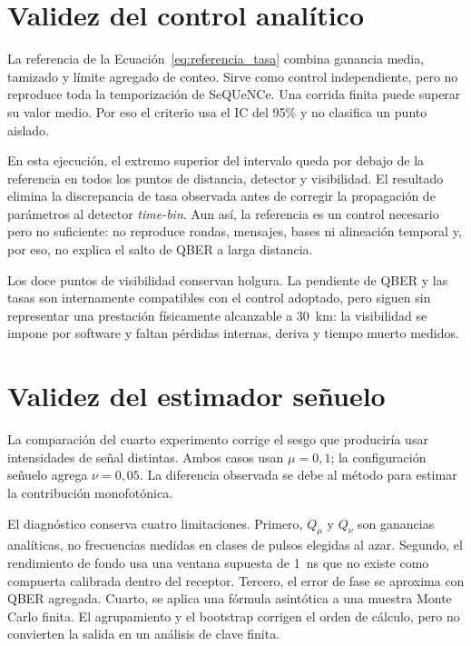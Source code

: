 \section{Validez del control analítico}

La referencia de la Ecuación~\ref{eq:referencia_tasa} combina ganancia media, tamizado y límite agregado de conteo. Sirve como control independiente, pero no reproduce toda la temporización de SeQUeNCe. Una corrida finita puede superar su valor medio. Por eso el criterio usa el IC del 95\% y no clasifica un punto aislado.

En esta ejecución, el extremo superior del intervalo queda por debajo de la referencia en todos los puntos de distancia, detector y visibilidad. El resultado elimina la discrepancia de tasa observada antes de corregir la propagación de parámetros al detector \textit{time-bin}. Aun así, la referencia es un control necesario pero no suficiente: no reproduce rondas, mensajes, bases ni alineación temporal y, por eso, no explica el salto de QBER a larga distancia.

Los doce puntos de visibilidad conservan holgura. La pendiente de QBER y las tasas son internamente compatibles con el control adoptado, pero siguen sin representar una prestación físicamente alcanzable a \SI{30}{\kilo\meter}: la visibilidad se impone por software y faltan pérdidas internas, deriva y tiempo muerto medidos.

\section{Validez del estimador señuelo}

La comparación del cuarto experimento corrige el sesgo que produciría usar intensidades de señal distintas. Ambos casos usan \(\mu=0{,}1\); la configuración señuelo agrega \(\nu=0{,}05\). La diferencia observada se debe al método para estimar la contribución monofotónica.

El diagnóstico conserva cuatro limitaciones. Primero, \(Q_\mu\) y \(Q_\nu\) son ganancias analíticas, no frecuencias medidas en clases de pulsos elegidas al azar. Segundo, el rendimiento de fondo usa una ventana supuesta de \SI{1}{\nano\second} que no existe como compuerta calibrada dentro del receptor. Tercero, el error de fase se aproxima con QBER agregada. Cuarto, se aplica una fórmula asintótica a una muestra Monte Carlo finita. El agrupamiento y el bootstrap corrigen el orden de cálculo, pero no convierten la salida en un análisis de clave finita.

